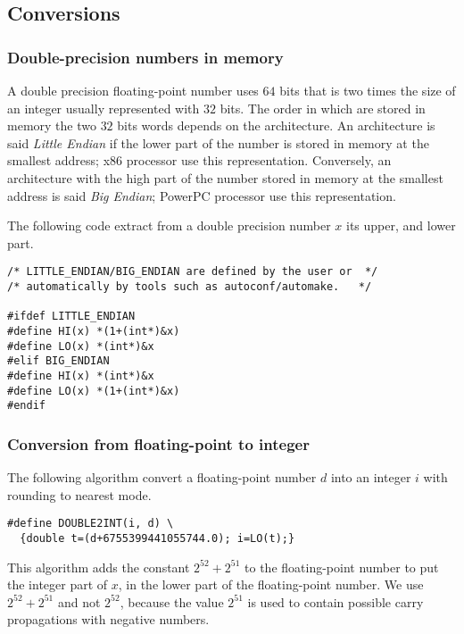 \subsection{Conversions}

\subsubsection{Double-precision numbers in memory\label{section:memory}}

A double precision floating-point number uses $64$ bits that is two
times the size of an integer usually represented with $32$ bits. The
order in which are stored in memory the two $32$ bits words depends on
the architecture. An architecture is said \emph{Little Endian} if the
lower part of the number is stored in memory at the smallest address;
x86 processor use this representation. Conversely, an architecture
with the high part of the number stored in memory at the smallest
address is said \emph{Big Endian}; PowerPC processor use this
representation.


The following code extract from a double precision number $x$ its
upper, and lower part.

\begin{lstlisting}[label={chap0:lst:endian},
  caption={Extract upper and lower part of a double precision number $x$},firstnumber=1]
/* LITTLE_ENDIAN/BIG_ENDIAN are defined by the user or  */
/* automatically by tools such as autoconf/automake.   */

#ifdef LITTLE_ENDIAN
#define HI(x) *(1+(int*)&x)
#define LO(x) *(int*)&x
#elif BIG_ENDIAN
#define HI(x) *(int*)&x
#define LO(x) *(1+(int*)&x)
#endif
\end{lstlisting}



\subsubsection{Conversion from floating-point to integer}

\begin{theorem}
  The following algorithm convert a floating-point number $d$ into an
  integer $i$ with rounding to nearest mode.

\begin{lstlisting}[label={chap0:lst:conversion2},caption={Solution 2},firstnumber=1]
#define DOUBLE2INT(i, d) \
  {double t=(d+6755399441055744.0); i=LO(t);}
\end{lstlisting}
\end{theorem}
This algorithm adds the constant $2^{52}+2^{51}$ to the floating-point
number to put the integer part of $x$, in the lower part of the
floating-point number.  We use $2^{52}+2^{51}$ and not $2^{52}$,
because the value $2^{51}$ is used to contain possible carry
propagations with negative numbers.



